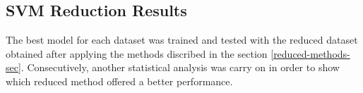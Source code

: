 \subsection{SVM Reduction Results}
The best model for each dataset was trained and tested with the reduced dataset obtained after applying the methods discribed in the section \ref{reduced-methods-sec}. Consecutively, another statistical analysis was carry on in order to show which reduced method offered a better performance.
